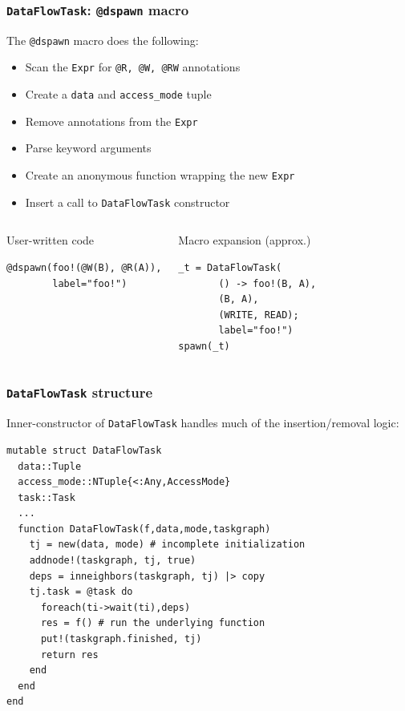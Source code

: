 \documentclass{beamer}
\begin{document}
\begin{frame}[fragile]

\frametitle{\texttt{DataFlowTask}: \texttt{@dspawn} macro}

The \texttt{@dspawn} macro does the following:

\begin{itemize}
    \item Scan the \texttt{Expr} for \texttt{@R, @W, @RW} annotations
    \item Create a \texttt{data} and \texttt{access_mode}
    tuple
    \item Remove annotations from the \texttt{Expr}
    \item Parse keyword arguments    
    \item Create an anonymous function wrapping the new \texttt{Expr}
    \item Insert a call to \texttt{DataFlowTask} constructor
\end{itemize}

\begin{columns}[T]

\begin{exampleblock}{User-written code}    
\begin{verbatim}
@dspawn(foo!(@W(B), @R(A)),
        label="foo!")
\end{verbatim}
\end{exampleblock}



\begin{exampleblock}{Macro expansion (approx.)}    
\begin{verbatim}
_t = DataFlowTask(
       () -> foo!(B, A),
       (B, A),
       (WRITE, READ);
       label="foo!")
spawn(_t)
\end{verbatim}
\end{exampleblock}

\end{columns}
%

\end{frame} 

\begin{frame}[fragile]

\frametitle{\texttt{DataFlowTask} structure}

\small{\alert{Inner-constructor of \texttt{DataFlowTask} handles much of
the insertion/removal logic:}}

\hrulefill
\begin{verbatim}
mutable struct DataFlowTask
  data::Tuple
  access_mode::NTuple{<:Any,AccessMode}
  task::Task
  ...
  function DataFlowTask(f,data,mode,taskgraph)
    tj = new(data, mode) # incomplete initialization
    addnode!(taskgraph, tj, true) 
    deps = inneighbors(taskgraph, tj) |> copy
    tj.task = @task do
      foreach(ti->wait(ti),deps)
      res = f() # run the underlying function
      put!(taskgraph.finished, tj)
      return res
    end
  end
end
\end{verbatim}

\end{frame} 
\end{document}
